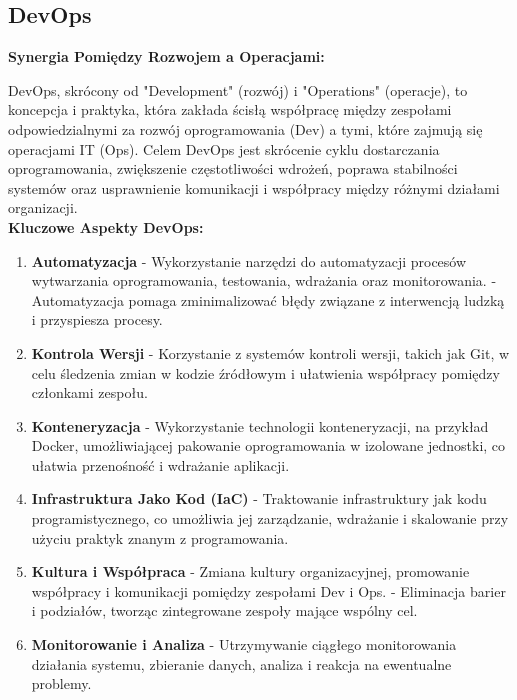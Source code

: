 \subsection{DevOps}

{\bf Synergia Pomiędzy Rozwojem a Operacjami:}

\noindent DevOps, skrócony od "Development" (rozwój) i "Operations" (operacje), to koncepcja i praktyka, która zakłada ścisłą współpracę między zespołami odpowiedzialnymi za rozwój oprogramowania (Dev) a tymi, które zajmują się operacjami IT (Ops). Celem DevOps jest skrócenie cyklu dostarczania oprogramowania, zwiększenie częstotliwości wdrożeń, poprawa stabilności systemów oraz usprawnienie komunikacji i współpracy między różnymi działami organizacji.
\\

{\noindent\bf Kluczowe Aspekty DevOps:} 
\begin{enumerate}
\item {\bf Automatyzacja}
   - Wykorzystanie narzędzi do automatyzacji procesów wytwarzania oprogramowania, testowania, wdrażania oraz monitorowania.
   - Automatyzacja pomaga zminimalizować błędy związane z interwencją ludzką i przyspiesza procesy.

\item {\bf Kontrola Wersji}
   - Korzystanie z systemów kontroli wersji, takich jak Git, w celu śledzenia zmian w kodzie źródłowym i ułatwienia współpracy pomiędzy członkami zespołu.

\item {\bf Konteneryzacja}
   - Wykorzystanie technologii konteneryzacji, na przykład Docker, umożliwiającej pakowanie oprogramowania w izolowane jednostki, co ułatwia przenośność i wdrażanie aplikacji.

\item {\bf Infrastruktura Jako Kod (IaC)}
   - Traktowanie infrastruktury jak kodu programistycznego, co umożliwia jej zarządzanie, wdrażanie i skalowanie przy użyciu praktyk znanym z programowania.

\item {\bf Kultura i Współpraca}
   - Zmiana kultury organizacyjnej, promowanie współpracy i komunikacji pomiędzy zespołami Dev i Ops.
   - Eliminacja barier i podziałów, tworząc zintegrowane zespoły mające wspólny cel.

\item {\bf Monitorowanie i Analiza}
   - Utrzymywanie ciągłego monitorowania działania systemu, zbieranie danych, analiza i reakcja na ewentualne problemy.
\end{enumerate}

